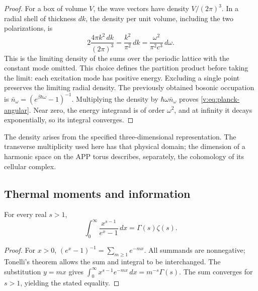 \begin{proof}
For a box of volume \(V\), the wave vectors have density
\(V/(2\pi)^3\). In a radial shell of thickness \(dk\), the density
per unit volume, including the two polarizations, is
\[
 2\frac{4\pi k^2\,dk}{(2\pi)^3}=\frac{k^2}{\pi^2}\,dk
 =\frac{\omega^2}{\pi^2c^3}\,d\omega.
\]
This is the limiting density of the sums over the periodic lattice
with the constant mode omitted. This choice defines the partition product
before taking the limit: each excitation mode has positive energy.
Excluding a single point preserves the limiting radial density.
The previously obtained bosonic occupation is
\(\bar n_\omega=(e^{\beta\hbar\omega}-1)^{-1}\).
Multiplying the density by \(\hbar\omega\bar n_\omega\) proves
\eqref{v:eq:planck-angular}. Near zero, the energy integrand is
of order \(\omega^2\), and at infinity it decays exponentially, so
its integral converges.
\end{proof}

The density arises from the specified three-dimensional representation.
The transverse multiplicity used here has that physical domain;
the dimension of a harmonic space on the APP torus describes,
separately, the cohomology of its cellular complex.



\subsection{Thermal moments and information}

\begin{lemma}
\label{v:lem:momento-bosonico}
For every real \(s>1\),
\begin{equation}
 \int_0^\infty\frac{x^{s-1}}{e^x-1}\,dx
 =\Gamma(s)\zeta(s).
 \label{v:eq:momento-bosonico}
\end{equation}
\end{lemma}
\begin{proof}
For \(x>0\), \((e^x-1)^{-1}=\sum_{m\geq1}e^{-mx}\).
All summands are nonnegative; Tonelli's theorem allows the sum
and integral to be interchanged. The substitution \(y=mx\) gives
\(\int_0^\infty x^{s-1}e^{-mx}\,dx=m^{-s}\Gamma(s)\).
The sum converges for \(s>1\), yielding the stated equality.
\end{proof}

